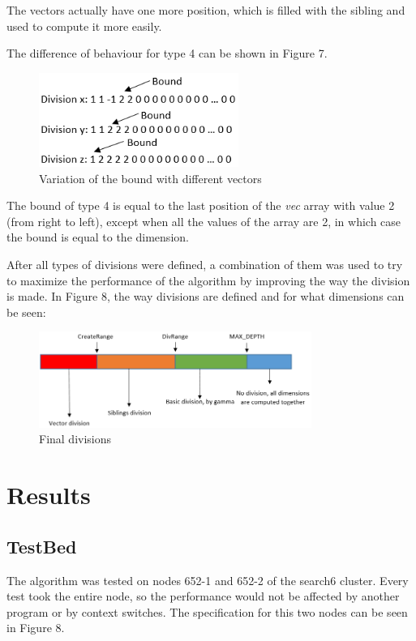 \documentclass[conference]{IEEEtran}
\begin{document}
The vectors actually have one more position, which is filled with the sibling and used to compute it more easily.

The difference of behaviour for type 4 can be shown in Figure 7.

\begin{figure}[ht!]
\centering
\includegraphics[width=65mm]{imgParallel/Type4}
\caption{Variation of the bound with different vectors}
\end{figure}

The bound of type 4 is equal to the last position of the \emph{vec} array with value 2 (from right to left), except when all the values of the array are 2, in which case the bound is equal to the dimension. 

After all types of divisions were defined, a combination of them was used to try to maximize the performance of the algorithm by improving the way the division is made. In Figure 8, the way divisions are defined and for what dimensions can be seen:

\begin{figure}[ht!]
\centering
\includegraphics[width=89mm]{imgParallel/TotalDivisions}
\caption{Final divisions}
\end{figure}

\section{Results} 
\subsection{TestBed}
The algorithm was tested on nodes 652-1 and 652-2 of the search6 cluster. Every test took the entire node, so the performance would not be affected by another program or by context switches. The specification for this two nodes can be seen in Figure 8.
\end{document}
